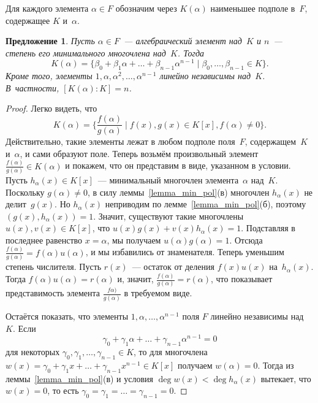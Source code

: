 \documentclass[a4paper,10pt]{amsart}
\newtheorem{proposition}{Предложение}
\theoremstyle{definition}
\theoremstyle{remark}
\begin{document}
Для каждого элемента $\alpha \in F$ обозначим через $K(\alpha)$
наименьшее подполе в~$F$, содержащее $K$ и~$\alpha$.

\begin{proposition}
Пусть $\alpha \in F$~--- алгебраический элемент над~$K$ и $n$~---
степень его минимального многочлена над~$K$. Тогда
$$
K(\alpha) = \{\beta_0 + \beta_1 \alpha + \ldots + \beta_{n-1}
\alpha^{n-1} \mid \beta_0, \ldots, \beta_{n-1} \in K\}.
$$
Кроме того, элементы $1, \alpha, \alpha^2, \ldots, \alpha^{n-1}$
линейно независимы над~$K$. В~частности, $[K(\alpha) : K] = n$.
\end{proposition}

\begin{proof}
Легко видеть, что
$$
K(\alpha) = \lbrace \frac{f(\alpha)}{g(\alpha)} \mid f(x), g(x) \in
K[x], f(\alpha) \ne 0 \rbrace.
$$
Действительно, такие элементы лежат в любом подполе поля~$F$,
содержащем~$K$ и~$\alpha$, и сами образуют поле. Теперь возьмём
произвольный элемент $\frac{f(\alpha)}{g(\alpha)} \in K(\alpha)$ и
покажем, что он представим в виде, указанном в условии. Пусть
$h_\alpha(x) \in K[x]$~--- минимальный многочлен элемента~$\alpha$
над~$K$. Поскольку $g(\alpha) \ne 0$, в силу
леммы~\ref{lemma_min_pol}(в) многочлен $h_\alpha(x)$ не
делит~$g(x)$. Но $h_\alpha(x)$ неприводим по
лемме~\ref{lemma_min_pol}(б), поэтому $(g(x), h_\alpha(x)) = 1$.
Значит, существуют такие многочлены $u(x), v(x) \in K[x]$, что $u(x)
g(x) + v(x) h_\alpha(x) = 1$. Подставляя в последнее равенство $x =
\alpha$, мы получаем $u(\alpha) g(\alpha) = 1$. Отсюда
$\frac{f(\alpha)}{g(\alpha)} = f(\alpha) u(\alpha)$, и мы избавились
от знаменателя. Теперь уменьшим степень числителя. Пусть $r(x)$~---
остаток от деления $f(x)u(x)$ на~$h_\alpha(x)$. Тогда $f(\alpha)
u(\alpha) = r(\alpha)$ и, значит, $\frac{f(\alpha)}{g(\alpha)} =
r(\alpha)$, что показывает представимость элемента
$\frac{f\alpha)}{g(\alpha)}$ в требуемом виде.

Остаётся показать, что элементы $1, \alpha, \ldots, \alpha^{n-1}$
поля $F$ линейно независимы над~$K$. Если $$\gamma_0 + \gamma_1
\alpha + \ldots + \gamma_{n-1} \alpha^{n-1} = 0$$ для некоторых
$\gamma_0, \gamma_1, \ldots, \gamma_{n-1} \in K$, то для многочлена
$w(x) = \gamma_0 + \gamma_1x + \ldots + \gamma_{n-1}x^{n-1} \in
K[x]$ получаем $w(\alpha) = 0$. Тогда из
леммы~\ref{lemma_min_pol}(в) и условия $\deg w(x) < \deg
h_\alpha(x)$ вытекает, что $w(x) = 0$, то есть $\gamma_0 = \gamma_1
= \ldots = \gamma_{n-1} = 0$.
\end{proof}
\end{document}
